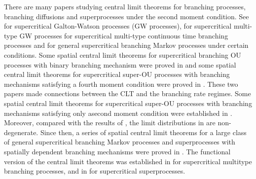 \documentclass[12pt,a4paper]{amsart}
\theoremstyle{plain}
\theoremstyle{definition}
\numberwithin{equation}{section}
\begin{document}
There are many papers studying central limit theorems for branching processes, branching diffusions and superprocesses under the second moment condition.
See   \cite{Heyde1970A-rate, HeydeBrown1871An-invariance, HeydeLeslie1971Improved} for %
supercritical Galton-Watson processes (GW processes),
\cite{KestenStigum1966Additional,KestenStigum1966A-limit} for supercritical multi-type %
GW processes
\cite{Athreya1969Limit,Athreya1969LimitB,Athreya1971Some} for supercritical multi-type continuous time branching processes and \cite{AsmussenHering1983Branching} for general supercritical branching Markov processes under certain conditions.
Some spatial central limit theorems for   supercritical branching OU processes with binary branching mechanism were proved in \cite{AdamczakMilos2015CLT} and some spatial central limit theorems for supercritical super-OU processes with branching mechanisms satisfying a fourth moment condition were proved in \cite{Milos2012Spatial}.
These two papers made connections between the CLT and  the branching rate regimes.
Some spatial central limit theorems for supercritical super-OU  processes with branching mechanisms satisfying only asecond moment condition were established in \cite{RenSongZhang2014Central}.
Moreover, compared with the results of \cite{AdamczakMilos2015CLT,Milos2012Spatial}, the limit distributions in \cite{RenSongZhang2014Central} are non-degenerate.
Since then, a series of spatial central limit theorems for a large class of general supercritical branching Markov processes and superprocesses with spatially dependent branching mechanisms were proved in \cite{RenSongZhang2014CentralB,RenSongZhang2015Central,RenSongZhang2017Central}.
The functional version of the central limit theorems was established in \cite{Janson2004Functional} for supercritical multitype branching processes, and  in \cite{RenSongZhang2017Functional} for supercritical superprocesses.
\end{document}

